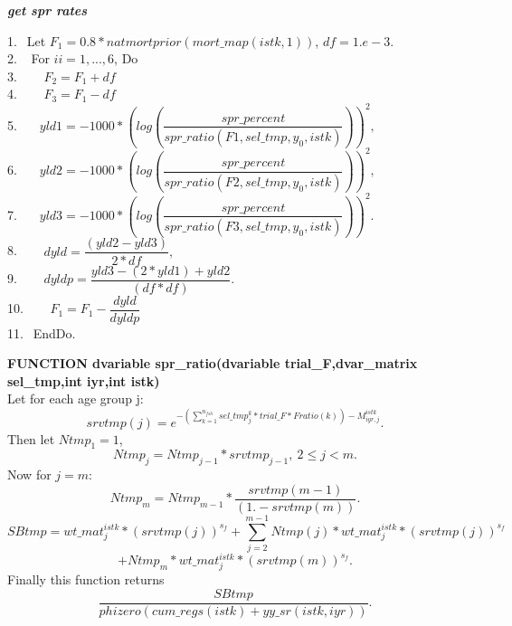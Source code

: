 \documentclass{article}
\begin{document}
 \begin{algorithm}[H]
	\caption{{\bf \textit{get spr rates}}}
	1. $\  \ $Let $F_1=0.8*natmortprior(mort\_map(istk,1))$, $df=1.e-3$. \\
    2. $\  \ $ For $ii=1,...,6$, Do \\
	3. $\  \ \quad$   $F_2 = F_1+df$\\
	4. $\  \ \quad$  $F_3 = F_1 -df$\\
	5. $\  \ \quad yld1 =-1000*\left(log\left(\dfrac{spr\_percent}{spr\_ratio(F1, sel\_tmp,y_0,istk)}\right)\right)^2,$\\
    6. $\  \ \quad yld2=-1000*\left(log\left(\dfrac{spr\_percent}{spr\_ratio(F2, sel\_tmp,y_0,istk)}\right)\right)^2,$\\
    7. $\  \ \quad yld3=-1000*\left(log\left(\dfrac{spr\_percent}{spr\_ratio(F3, sel\_tmp,y_0,istk)}\right)\right)^2.$\\
    8. $\  \ \quad$   $dyld=\dfrac{(yld2-yld3)}{2*df},$\\
    9. $\  \ \quad$   $dyldp=\dfrac{yld3-(2*yld1)+yld2}{(df*df)}$.\\
    10. $\  \ \quad$    $F_1=F_{1}-\dfrac{dyld}{dyldp}$\\
    11. $\  \ $EndDo.
    
\end{algorithm}




\textbf{FUNCTION dvariable spr\_ratio(dvariable trial\_F,dvar\_matrix sel\_tmp,int iyr,int istk)}\\

Let for each age group j:
\begin{equation}
    srvtmp(j)=e^{-(\sum_{k=1}^{n_{fsh}}sel\_tmp^k_j*trial\_F*Fratio(k))-M^{istk}_{iyr,j}}.
\end{equation}
Then let $Ntmp_1=1$,
\begin{equation}
    Ntmp_j=Ntmp_{j-1}*srvtmp_{j-1}, \  2\leq j < m.
\end{equation}
Now for $j=m$:
\begin{equation}
Ntmp_{m}=Ntmp_{m-1}*\dfrac{srvtmp(m-1)}{(1.-srvtmp(m))}.
\end{equation}
\begin{equation}
    SBtmp=wt\_mat^{istk}_j*(srvtmp(j))^{s_f}+\sum_{ j=2}^{m-1}Ntmp(j)*wt\_mat^{istk}_j*(srvtmp(j))^{s_f} 
\end{equation}
\begin{equation*}
+Ntmp_{m}*wt\_mat^{istk}_j*(srvtmp(m))^{s_f}.
\end{equation*}
Finally this function returns 
\begin{equation}
    \dfrac{SBtmp}{phizero(cum\_regs(istk)+yy\_sr(istk,iyr))}.
\end{equation}
\end{document}
